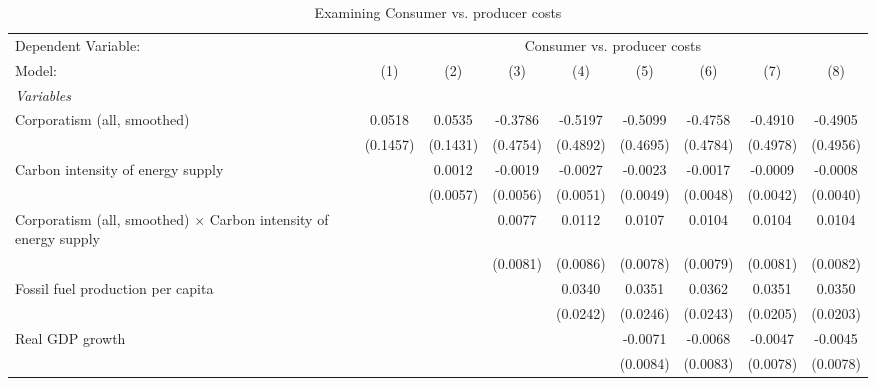 
\begin{table}[htbp]
   \caption{Examining Consumer vs. producer costs}
   \centering
   \begin{tabular}{lcccccccc}
      \tabularnewline \midrule \midrule
      Dependent Variable: & \multicolumn{8}{c}{Consumer vs. producer costs}\\
      Model:                                                                  & (1)      & (2)      & (3)      & (4)      & (5)      & (6)      & (7)      & (8)\\  
      \midrule
      \emph{Variables}\\
      Corporatism (all, smoothed)                                             & 0.0518   & 0.0535   & -0.3786  & -0.5197  & -0.5099  & -0.4758  & -0.4910  & -0.4905\\   
                                                                              & (0.1457) & (0.1431) & (0.4754) & (0.4892) & (0.4695) & (0.4784) & (0.4978) & (0.4956)\\   
      Carbon intensity of energy supply                                       &          & 0.0012   & -0.0019  & -0.0027  & -0.0023  & -0.0017  & -0.0009  & -0.0008\\   
                                                                              &          & (0.0057) & (0.0056) & (0.0051) & (0.0049) & (0.0048) & (0.0042) & (0.0040)\\   
      Corporatism (all, smoothed) $\times$ Carbon intensity of energy supply  &          &          & 0.0077   & 0.0112   & 0.0107   & 0.0104   & 0.0104   & 0.0104\\   
                                                                              &          &          & (0.0081) & (0.0086) & (0.0078) & (0.0079) & (0.0081) & (0.0082)\\   
      Fossil fuel production per capita                                       &          &          &          & 0.0340   & 0.0351   & 0.0362   & 0.0351   & 0.0350\\   
                                                                              &          &          &          & (0.0242) & (0.0246) & (0.0243) & (0.0205) & (0.0203)\\   
      Real GDP growth                                                         &          &          &          &          & -0.0071  & -0.0068  & -0.0047  & -0.0045\\   
                                                                              &          &          &          &          & (0.0084) & (0.0083) & (0.0078) & (0.0078)\\   

\end{tabular}
\end{table}
